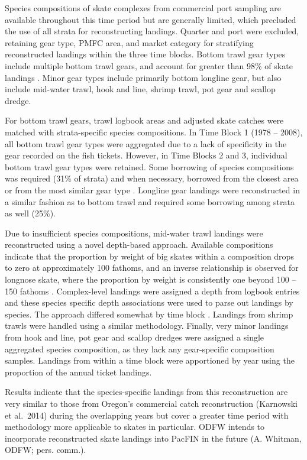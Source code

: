\documentclass[12pt,]{article}
\begin{document}
Species compositions of skate complexes from commercial port sampling
are available throughout this time period but are generally limited,
which precluded the use of all strata for reconstructing landings.
Quarter and port were excluded, retaining gear type, PMFC area, and
market category for stratifying reconstructed landings within the three
time blocks. Bottom trawl gear types include multiple bottom trawl
gears, and account for greater than 98\% of skate landings . Minor gear
types include primarily bottom longline gear, but also include mid-water
trawl, hook and line, shrimp trawl, pot gear and scallop dredge.

For bottom trawl gears, trawl logbook areas and adjusted skate catches
were matched with strata-specific species compositions. In Time Block 1
(1978 -- 2008), all bottom trawl gear types were aggregated due to a
lack of specificity in the gear recorded on the fish tickets. However,
in Time Blocks 2 and 3, individual bottom trawl gear types were
retained. Some borrowing of species compositions was required (31\% of
strata) and when necessary, borrowed from the closest area or from the
most similar gear type . Longline gear landings were reconstructed in a
similar fashion as to bottom trawl and required some borrowing among
strata as well (25\%).

Due to insufficient species compositions, mid-water trawl landings were
reconstructed using a novel depth-based approach. Available compositions
indicate that the proportion by weight of big skates within a
composition drops to zero at approximately 100 fathoms, and an inverse
relationship is observed for longnose skate, where the proportion by
weight is consistently one beyond 100 -- 150 fathoms . Complex-level
landings were assigned a depth from logbook entries and these species
specific depth associations were used to parse out landings by species.
The approach differed somewhat by time block . Landings from shrimp
trawls were handled using a similar methodology. Finally, very minor
landings from hook and line, pot gear and scallop dredges were assigned
a single aggregated species composition, as they lack any gear-specific
composition samples. Landings from within a time block were apportioned
by year using the proportion of the annual ticket landings.

Results indicate that the species-specific landings from this
reconstruction are very similar to those from Oregon's commercial catch
reconstruction (Karnowski et al.~2014) during the overlapping years but
cover a greater time period with methodology more applicable to skates
in particular. ODFW intends to incorporate reconstructed skate landings
into PacFIN in the future (A. Whitman, ODFW; pers. comm.).
\end{document}
